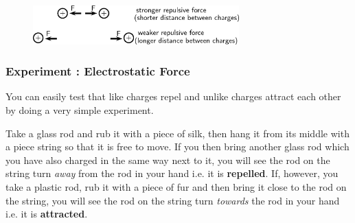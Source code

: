 	\begin{figure}[H] %
    \begin{center}
    \label{m38780*id200924!!!underscore!!!media}\label{m38780*id200924!!!underscore!!!printimage}\includegraphics[width=300px]{col11305.imgs/m38780_PG10C8_005.png} %
        
      \vspace{2pt}
    \vspace{.1in}
    
    \end{center}

 \end{figure}   

    \addtocounter{footnote}{-0}
    
      \par 
\label{m38780*secfhsst!!!underscore!!!id162}
            \subsubsection{  Experiment : Electrostatic Force }
            \nopagebreak
            
      \label{m38780*id200937}You can easily test that
like charges repel and unlike charges attract each other by doing a very
simple experiment.\par 
      \label{m38780*id200944}Take a glass rod and rub it with a piece of silk, then hang it from its middle with a piece string so that it is free to move. If you then bring another glass rod which you
have also charged in the same way next to it, you will see the rod
on the string turn \textsl{away} from the rod in your hand i.e. it
is \textbf{repelled}. If, however, you take a plastic rod, rub it
with a piece of fur and then bring it close to the rod on the
string, you will see the rod on the string turn \textsl{towards} the
rod in your hand i.e. it is \textbf{attracted}.\par 
      \label{m38780*id200971}
        
    \setcounter{subfigure}{0}


